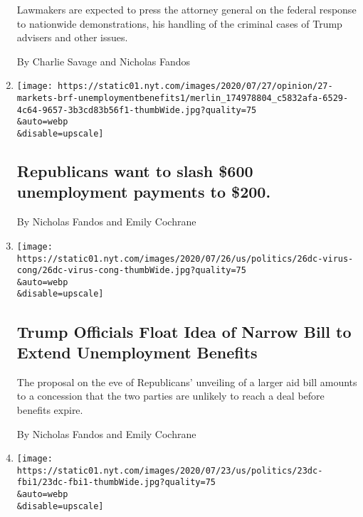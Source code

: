 \begin{enumerate}
  Lawmakers are expected to press the attorney general on the federal
  response to nationwide demonstrations, his handling of the criminal
  cases of Trump advisers and other issues.

  By Charlie Savage and Nicholas Fandos
\item
  \href{/live/2020/07/27/business/stock-market-today-coronavirus/republicans-want-to-slash-600-unemployment-payments-to-200}{}

  \texttt{[image: https://static01.nyt.com/images/2020/07/27/opinion/27-markets-brf-unemploymentbenefits1/merlin\_174978804\_c5832afa-6529-4c64-9657-3b3cd83b56f1-thumbWide.jpg?quality=75\\\&auto=webp\\\&disable=upscale]}

  \hypertarget{republicans-want-to-slash-600-unemployment-payments-to-200}{%
  \subsection{Republicans want to slash \$600 unemployment payments to
  \$200.}\label{republicans-want-to-slash-600-unemployment-payments-to-200}}

  By Nicholas Fandos and Emily Cochrane
\item
  \href{/2020/07/26/us/politics/coronavirus-stimulus-bill-unemployment.html}{}

  \texttt{[image: https://static01.nyt.com/images/2020/07/26/us/politics/26dc-virus-cong/26dc-virus-cong-thumbWide.jpg?quality=75\\\&auto=webp\\\&disable=upscale]}

  \hypertarget{trump-officials-float-idea-of-narrow-bill-to-extend-unemployment-benefits}{%
  \subsection{Trump Officials Float Idea of Narrow Bill to Extend
  Unemployment
  Benefits}\label{trump-officials-float-idea-of-narrow-bill-to-extend-unemployment-benefits}}

  The proposal on the eve of Republicans' unveiling of a larger aid bill
  amounts to a concession that the two parties are unlikely to reach a
  deal before benefits expire.

  By Nicholas Fandos and Emily Cochrane
\item
  \href{/2020/07/25/us/politics/igor-danchenko-steele-dossier.html}{}

  \texttt{[image: https://static01.nyt.com/images/2020/07/23/us/politics/23dc-fbi1/23dc-fbi1-thumbWide.jpg?quality=75\\\&auto=webp\\\&disable=upscale]}


\end{enumerate}

